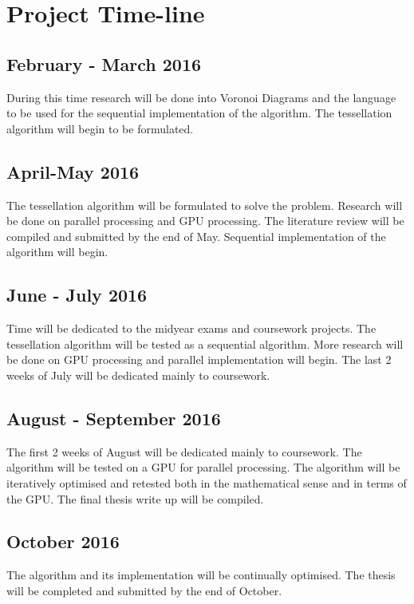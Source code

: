 \section{Project Time-line}

\subsection{February - March 2016}
During this time research will be done into Voronoi Diagrams and the language to be used for the sequential implementation of the algorithm. The tessellation algorithm will begin to be formulated.

\subsection{April-May 2016}
The tessellation algorithm will be formulated to solve the problem. Research will be done on parallel processing and GPU processing. The literature review will be compiled and submitted by the end of May. Sequential implementation of the algorithm will begin.

\subsection{June - July 2016}
Time will be dedicated to the midyear exams and coursework projects. The tessellation algorithm will be tested as a sequential algorithm. More research will be done on GPU processing and parallel implementation will begin. The last 2 weeks of July will be dedicated mainly to coursework.

\subsection{August - September 2016}
The first 2 weeks of August will be dedicated mainly to coursework. The algorithm will be tested on a GPU for parallel processing. The algorithm will be iteratively optimised and retested both in the mathematical sense and in terms of the GPU. The final thesis write up will be compiled.

\subsection{October 2016}
The algorithm and its implementation will be continually optimised. The thesis will be completed and submitted by the end of October.

